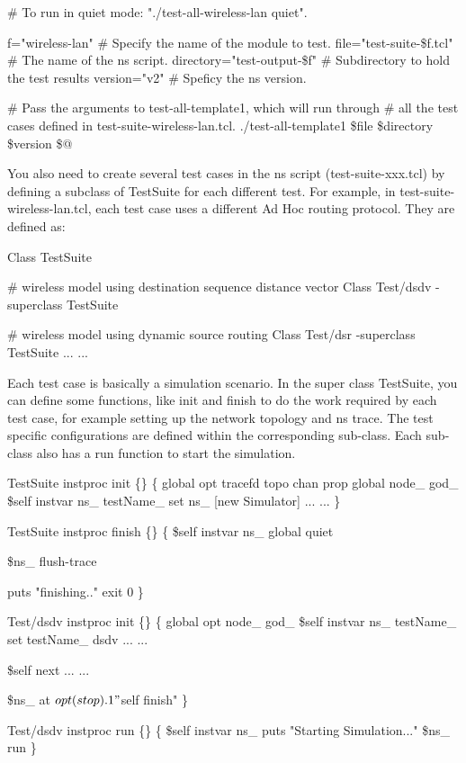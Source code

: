 \begin{program}
   \# To run in quiet mode:  "./test-all-wireless-lan quiet".

   f="wireless-lan"		\# Specify the name of the module to test.
   file="test-suite-\$f.tcl"	\# The name of the ns script.
   directory="test-output-\$f" 	\# Subdirectory to hold the test results
   version="v2"			\# Speficy the ns version.
   
   \# Pass the arguments to test-all-template1, which will run through
   \# all the test cases defined in test-suite-wireless-lan.tcl.
   ./test-all-template1 \$file \$directory \$version \$@
\end{program}


You also need to create several test cases in the ns script (test-suite-xxx.tcl)
by defining a subclass of TestSuite for each different test. For example, in 
test-suite-wireless-lan.tcl, each test case uses a different Ad Hoc routing 
protocol. They are defined as:

\begin{program}	
   Class TestSuite

   \# wireless model using destination sequence distance vector
   Class Test/dsdv -superclass TestSuite

   \# wireless model using dynamic source routing
   Class Test/dsr -superclass TestSuite
   ... ...

\end{program}


Each test case is basically a simulation scenario. In the super class 
TestSuite, you can define some functions, like init and finish to do the work 
required by each test case, for example setting up the network topology and ns
trace. The test specific configurations are defined within the corresponding 
sub-class. Each sub-class also has a run function to start the simulation.

\begin{program}	
   TestSuite instproc init \{\} \{
     global opt tracefd topo chan prop 
     global node_ god_ 
     \$self instvar ns_ testName_
     set ns_         [new Simulator]
      ... ...
   \} 

   TestSuite instproc finish \{\} \{
     \$self instvar ns_
     global quiet

     \$ns_ flush-trace

     puts "finishing.."
     exit 0
   \}
        
   Test/dsdv instproc init \{\} \{
     global opt node_ god_
     \$self instvar ns_ testName_
     set testName_       dsdv
     ... ...    

     \$self next
     ... ...

     \$ns_ at $opt(stop).1 "$self finish"
   \}

   Test/dsdv instproc run \{\} \{
     \$self instvar ns_
     puts "Starting Simulation..."
     \$ns_ run
   \}
\end{program}

